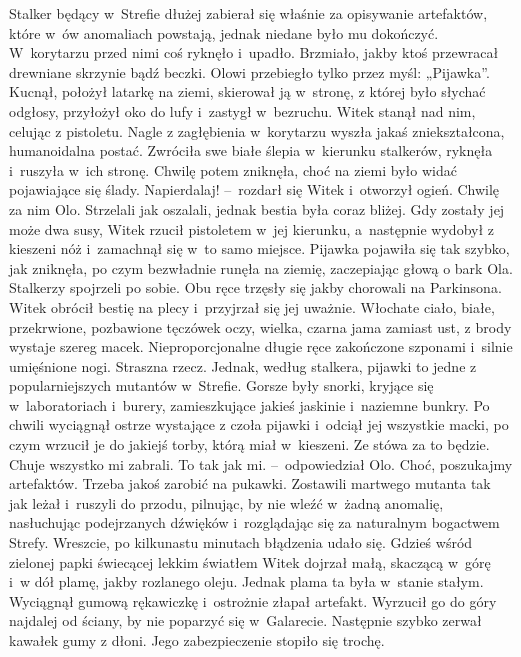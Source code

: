 \documentclass[../MAIN.tex]{subfiles}
\begin{document}
Stalker będący w~Strefie dłużej zabierał się właśnie za opisywanie artefaktów, które w~ów anomaliach powstają, jednak niedane było mu dokończyć. W~korytarzu przed nimi coś ryknęło i~upadło. Brzmiało, jakby ktoś przewracał drewniane skrzynie bądź beczki. Olowi przebiegło tylko przez myśl: „Pijawka”. Kucnął, położył latarkę na ziemi, skierował ją w~stronę, z której było słychać odgłosy, przyłożył oko do lufy i~zastygł w~bezruchu. Witek stanął nad nim, celując z pistoletu.
\pp
Nagle z zagłębienia w~korytarzu wyszła jakaś zniekształcona, humanoidalna postać. Zwróciła swe białe ślepia w~kierunku stalkerów, ryknęła i~ruszyła w~ich stronę. Chwilę potem zniknęła, choć na ziemi było widać pojawiające się ślady.
\dd
\sd
\xx Napierdalaj! --~rozdarł się Witek i~otworzył ogień. Chwilę za nim Olo.
\qd
\hspace{32.55em} Strzelali jak oszalali, jednak bestia była coraz bliżej. Gdy zostały jej może dwa susy, Witek rzucił pistoletem w~jej kierunku, a~następnie wydobył z kieszeni nóż i~zamachnął się w~to samo miejsce. Pijawka pojawiła się tak szybko, jak zniknęła, po czym bezwładnie runęła na ziemię, zaczepiając głową o bark Ola. Stalkerzy spojrzeli po sobie. Obu ręce trzęsły się jakby chorowali na Parkinsona.
\pp
Witek obrócił bestię na plecy i~przyjrzał się jej uważnie. Włochate ciało, białe, przekrwione, pozbawione tęczówek oczy, wielka, czarna jama zamiast ust, z brody wystaje szereg macek. Nieproporcjonalne długie ręce zakończone szponami i~silnie umięśnione nogi. Straszna rzecz. Jednak, według stalkera, pijawki to jedne z popularniejszych mutantów w~Strefie. Gorsze były snorki, kryjące się w~laboratoriach i~burery, zamieszkujące jakieś jaskinie i~naziemne bunkry.
\pp
Po chwili wyciągnął ostrze wystające z czoła pijawki i~odciął jej wszystkie macki, po czym wrzucił je do jakiejś torby, którą miał w~kieszeni.
\dd
\sd
\xx Ze stówa za to będzie. Chuje wszystko mi zabrali.
\xx To tak jak mi. --~odpowiedział Olo.
\xx Choć, poszukajmy artefaktów. Trzeba jakoś zarobić na pukawki.
\qd
\mm Zostawili martwego mutanta tak jak leżał i~ruszyli do przodu, pilnując, by nie wleźć w~żadną anomalię, nasłuchując podejrzanych dźwięków i~rozglądając się za naturalnym bogactwem Strefy. Wreszcie, po kilkunastu minutach błądzenia udało się. Gdzieś wśród zielonej papki świecącej lekkim światłem Witek dojrzał małą, skaczącą w~górę i~w dół plamę, jakby rozlanego oleju. Jednak plama ta była w~stanie stałym. Wyciągnął gumową rękawiczkę i~ostrożnie złapał artefakt. Wyrzucił go do góry najdalej od ściany, by nie poparzyć się w~Galarecie. Następnie szybko zerwał kawałek gumy z dłoni. Jego zabezpieczenie stopiło się trochę.
\end{document}
